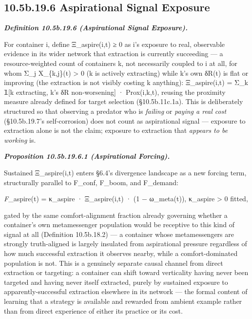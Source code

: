 \documentclass[
]{article}
\begin{document}
\hypertarget{b.19.6-aspirational-signal-exposure}{%
\subsection{10.5b.19.6 Aspirational Signal
Exposure}\label{b.19.6-aspirational-signal-exposure}}

\emph{\textbf{Definition 10.5b.19.6 (Aspirational Signal Exposure).}}

For container i, define Ξ\_aspire(i,t) ≥ 0 as i's exposure to real,
observable evidence in its wider network that extraction is currently
succeeding --- a resource-weighted count of containers k, not
necessarily coupled to i at all, for whom Σ\_j X\_\{k,j\}(t)
\textgreater{} 0 (k is actively extracting) while k's own δR(t) is flat
or improving (the extraction is not visibly costing k anything):
Ξ\_aspire(i,t) = Σ\_k 𝟙{[}k extracting, k's δR non-worsening{]} ·
Prox(i,k,t), reusing the proximity measure already defined for target
selection (§10.5b.11c.1a). This is deliberately structured so that
observing a predator who is \emph{failing} or \emph{paying a real cost}
(§10.5b.19.7's self-corrosion) does not count as aspirational signal ---
exposure to extraction alone is not the claim; exposure to extraction
that \emph{appears to be working} is.

\emph{\textbf{Proposition 10.5b.19.6.1 (Aspirational Forcing).}}

Sustained Ξ\_aspire(i,t) enters §6.4's divergence landscape as a new
forcing term, structurally parallel to F\_conf, F\_boom, and F\_demand:

\emph{F}\_aspire(t) = κ\_aspire · Ξ\_aspire(i,t) · (1 − ω\_meta(t)),
κ\_aspire \textgreater{} 0 fitted,

gated by the same comfort-alignment fraction already governing whether a
container's own metamessenger population would be receptive to this kind
of signal at all (Definition 10.5b.18.2) --- a container whose
metamessengers are strongly truth-aligned is largely insulated from
aspirational pressure regardless of how much successful extraction it
observes nearby, while a comfort-dominated population is not. This is a
genuinely separate causal channel from direct extraction or targeting: a
container can shift toward verticality having never been targeted and
having never itself extracted, purely by sustained exposure to
apparently-successful extraction elsewhere in its network --- the formal
content of learning that a strategy is available and rewarded from
ambient example rather than from direct experience of either its
practice or its cost.
\end{document}
